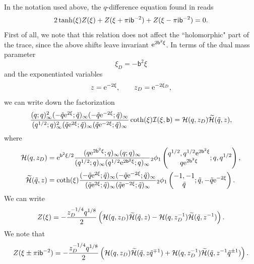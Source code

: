 \documentclass[a4paper,11pt]{article}
\theoremstyle{definition}
\newcommand{\CH}{{\cal H}}
\newcommand{\CI}{{\cal I}}
\newcommand{\re}{{\rm e}}
\newcommand{\ri}{{\rm i}}
\def\tq{{\tilde{q}}}
\newcommand{\mb}{\mathsf{b}}
\newcommand{\ba}{\begin{aligned}}
\newcommand{\ea}{\end{aligned}}
\newcommand{\qhg}[6]{{}_#1\phi_{#2}
  \left(\begin{matrix}
    #3  \\
    #4
  \end{matrix} ; #5, #6\right)}
\begin{document}
In the notation used above, the $q$-difference equation found in \cite{bgt-qdef} reads
%
\begin{equation}
\label{dif-qp}
2 \tanh(\xi) Z(\xi)+ Z(\xi+ \pi \ri \mb^{-2})+ Z(\xi- \pi \ri \mb^{-2})=0. 
\end{equation}
%
First of all, we note that this relation does not affect the ``holomorphic" part of the trace, since the above shifts leave invariant $\re^{2 \mb^2 \xi}$. 
In terms of the dual mass parameter 
%
\begin{equation}
\xi_D=- \mb^2 \xi
\end{equation}
%
and the exponentiated variables
%
\begin{equation}
z= \re^{-2 \xi}, \qquad z_D= \re^{-2 \xi_D},
\end{equation}
%
we can write down the factorization 
%
\begin{equation}
  \frac{(q;q)_\infty^2(-\tq \re^{2\xi};\tq)_\infty
    (-\tq\re^{-2\xi};\tq)_\infty}
  {(q^{1/2};q)_\infty^2(\tq\re^{2\xi};\tq)_\infty
    (\tq\re^{-2\xi};\tq)_\infty}
  \coth(\xi)\CI(\xi, \mb)= \CH( q, z_D) \widetilde \CH (\tq, z), 
\end{equation}
%
where
%
\begin{equation}
\ba
\CH( q, z_D)&= \re^{\mb^2 \xi/2} 
 {(q\re^{2 \mb^2 \xi};q)_\infty (q;q)_\infty 
   \over (q^{1/2};q)_\infty (q^{1/2} \re^{2 \mb^2 \xi};q)_\infty}
 \qhg{2}{1}{q^{1/2},q^{1/2} \re^{2 \mb^2 \xi}}{q \re^{2 \mb^2 \xi}}{q}{q^{1/2}}
, \\
\widetilde \CH( \tq, z)&= \coth(\xi) { (-\tq \re^{2 \xi}
  ;\tq)_\infty(-\tq \re^{-2 \xi} ;\tq)_\infty\over (\tq \re^{2
    \xi};\tq)_\infty (\tq \re^{-2 \xi};\tq)_\infty}
\qhg{2}{1}{-1,-1}{\tq}{\tq}{-\tq \re^{-2 \xi}}
. 
\ea
\end{equation}
%
We can write 
%
\begin{equation}
Z(\xi)= -{z_D^{-1/4} q^{1/8}  \over 2} \left( \CH( q, z_D) \widetilde \CH (\tq, z)- \CH( q, z^{-1}_D) \widetilde \CH (\tq, z^{-1})\right). 
\end{equation}
%
 We note that 
 \begin{equation}
   Z(\xi\pm  \pi \ri \mb^{-2})= -{z_D^{-1/4} q^{1/8}  \over 2} \left(\CH( q, z_D) \widetilde \CH (\tq, z \tq^{\mp 1})+ \CH( q, z^{-1}_D) \widetilde \CH (\tq, z^{-1}\tq^{\pm 1})\right). 
 \end{equation}
\end{document}
